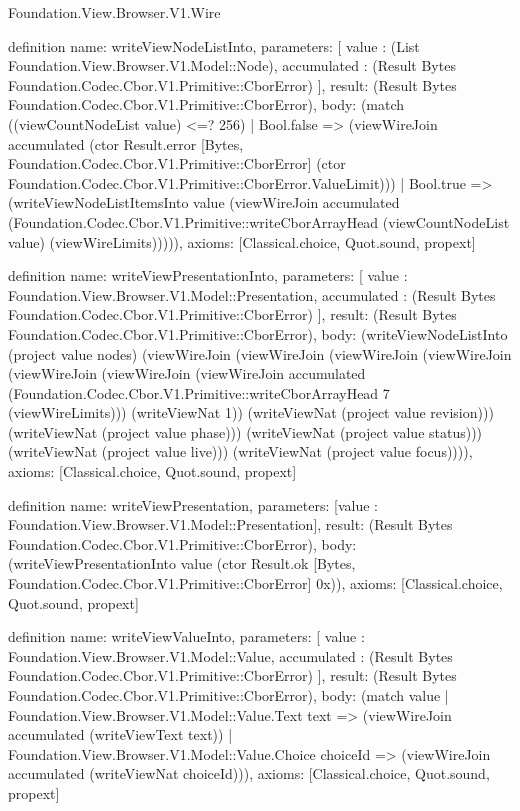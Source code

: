 \begin{lexlean}{Foundation.View.Browser.V1.Wire}
\begin{semanticmodule}
definition{
  name: writeViewNodeListInto,
  parameters: [
    value : (List Foundation.View.Browser.V1.Model::Node),
    accumulated : (Result Bytes Foundation.Codec.Cbor.V1.Primitive::CborError)
  ],
  result: (Result Bytes Foundation.Codec.Cbor.V1.Primitive::CborError),
  body: (match ((viewCountNodeList value) <=? 256)
    | Bool.false => (viewWireJoin accumulated (ctor Result.error [Bytes, Foundation.Codec.Cbor.V1.Primitive::CborError] (ctor Foundation.Codec.Cbor.V1.Primitive::CborError.ValueLimit)))
    | Bool.true => (writeViewNodeListItemsInto value (viewWireJoin accumulated (Foundation.Codec.Cbor.V1.Primitive::writeCborArrayHead (viewCountNodeList value) (viewWireLimits))))),
  axioms: [Classical.choice, Quot.sound, propext]
}

definition{
  name: writeViewPresentationInto,
  parameters: [
    value : Foundation.View.Browser.V1.Model::Presentation,
    accumulated : (Result Bytes Foundation.Codec.Cbor.V1.Primitive::CborError)
  ],
  result: (Result Bytes Foundation.Codec.Cbor.V1.Primitive::CborError),
  body: (writeViewNodeListInto (project value nodes) (viewWireJoin (viewWireJoin (viewWireJoin (viewWireJoin (viewWireJoin (viewWireJoin (viewWireJoin accumulated (Foundation.Codec.Cbor.V1.Primitive::writeCborArrayHead 7 (viewWireLimits))) (writeViewNat 1)) (writeViewNat (project value revision))) (writeViewNat (project value phase))) (writeViewNat (project value status))) (writeViewNat (project value live))) (writeViewNat (project value focus)))),
  axioms: [Classical.choice, Quot.sound, propext]
}

definition{
  name: writeViewPresentation,
  parameters: [value : Foundation.View.Browser.V1.Model::Presentation],
  result: (Result Bytes Foundation.Codec.Cbor.V1.Primitive::CborError),
  body: (writeViewPresentationInto value (ctor Result.ok [Bytes, Foundation.Codec.Cbor.V1.Primitive::CborError] 0x)),
  axioms: [Classical.choice, Quot.sound, propext]
}

definition{
  name: writeViewValueInto,
  parameters: [
    value : Foundation.View.Browser.V1.Model::Value,
    accumulated : (Result Bytes Foundation.Codec.Cbor.V1.Primitive::CborError)
  ],
  result: (Result Bytes Foundation.Codec.Cbor.V1.Primitive::CborError),
  body: (match value
    | Foundation.View.Browser.V1.Model::Value.Text text => (viewWireJoin accumulated (writeViewText text))
    | Foundation.View.Browser.V1.Model::Value.Choice choiceId => (viewWireJoin accumulated (writeViewNat choiceId))),
  axioms: [Classical.choice, Quot.sound, propext]
}


\end{semanticmodule}
\end{lexlean}
